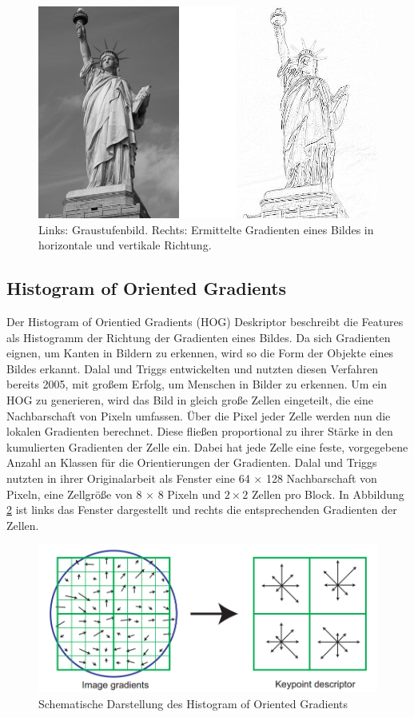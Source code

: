 \begin{figure}
	\centering
	\includegraphics[scale=0.5]{images/liberty_grad.png}
	\caption{Links: Graustufenbild. Rechts: Ermittelte Gradienten eines Bildes in horizontale und vertikale Richtung.}
	\label{img:grad}
\end{figure}

\subsection{Histogram of Oriented Gradients}

Der Histogram of Orientied Gradients (HOG) Deskriptor beschreibt die Features als Histogramm der Richtung der Gradienten eines Bildes. Da sich Gradienten eignen, um Kanten in Bildern zu erkennen, wird so die Form der Objekte eines Bildes erkannt. Dalal und Triggs \cite{hog2005} entwickelten und nutzten diesen Verfahren bereits 2005, mit großem Erfolg, um Menschen in Bilder zu erkennen. 
Um ein HOG zu generieren, wird das Bild in gleich große Zellen eingeteilt, die eine Nachbarschaft von Pixeln umfassen. Über die Pixel jeder Zelle werden nun die lokalen Gradienten berechnet. Diese fließen proportional zu ihrer Stärke in den kumulierten Gradienten der Zelle ein. Dabei hat jede Zelle eine feste, vorgegebene Anzahl an Klassen für die Orientierungen der Gradienten. 
Dalal und Triggs nutzten in ihrer Originalarbeit als Fenster eine 64 $\times$ 128 Nachbarschaft von Pixeln, eine Zellgröße von 8 $\times$ 8 Pixeln und $2 \times 2$ Zellen pro Block. In Abbildung \ref{img:hog} ist links das Fenster dargestellt und rechts die entsprechenden Gradienten der Zellen. 

\begin{figure}
	\centering
	\includegraphics[scale=0.5]{images/hog.png}
	\caption{Schematische Darstellung des Histogram of Oriented Gradients  \cite{dif2004}}
	\label{img:hog}
\end{figure}

